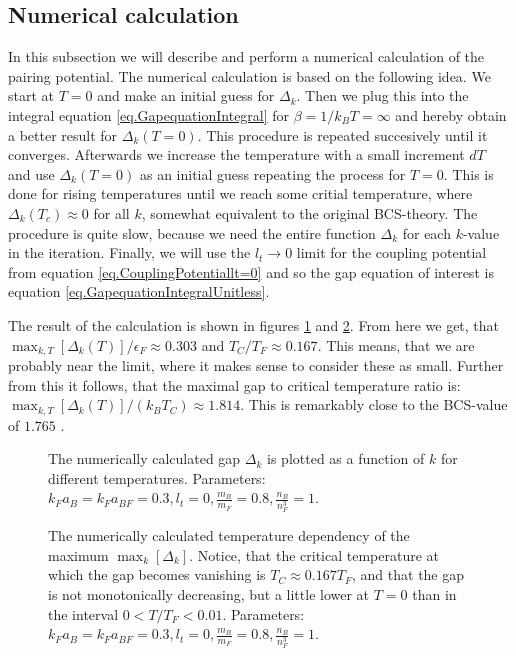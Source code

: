 \subsection{Numerical calculation} \label{subsec.pairing.numerical}
In this subsection we will describe and perform a numerical calculation of the pairing potential. The numerical calculation is based on the following idea. We start at $T=0$ and make an initial guess for $\Delta_k$. Then we plug this into the integral equation \eqref{eq.GapequationIntegral} for $\beta = 1/k_BT = \infty$ and hereby obtain a better result for $\Delta_k(T=0)$. This procedure is repeated succesively until it converges. Afterwards we increase the temperature with a small increment $dT$ and use $\Delta_k(T=0)$ as an initial guess repeating the process for $T=0$. This is done for rising temperatures until we reach some critial temperature, where $\Delta_k(T_c)\approx 0$ for all $k$, somewhat equivalent to the original BCS-theory\cite{Tinkham,LandauStatPhys2,PlischkeStatPhys}. The procedure is quite slow, because we need the entire function $\Delta_k$ for each $k$-value in the iteration. Finally, we will use the $l_t \to 0$ limit for the coupling potential from equation \eqref{eq.CouplingPotentiallt=0} and so the gap equation of interest is equation \eqref{eq.GapequationIntegralUnitless}. 

The result of the calculation is shown in figures \ref{fig.Deltakkdepend} and \ref{fig.maxkDeltakTdepend}. From here we get, that $\max_{k,T}[\Delta_k(T)]/\epsilon_F \approx 0.303$ and $T_C/T_F \approx 0.167$. This means, that we are probably near the limit, where it makes sense to consider these as small. Further from this it follows, that the maximal gap to critical temperature ratio is: $\max_{k,T}[\Delta_k(T)]/(k_B T_C) \approx 1.814$. This is remarkably close to the BCS-value of $1.765$ \cite{BruusFlensberg}.  

\begin{figure} 
\begin{center}  
  
\caption{The numerically calculated gap $\Delta_k$ is plotted as a function of $k$ for different temperatures. Parameters: $k_F a_B = k_F a_{BF} = 0.3, l_t = 0, \frac{m_B}{m_F} = 0.8, \frac{n_B}{n_F^3} = 1$. }  
\label{fig.Deltakkdepend}  
\end{center}    
\end{figure}

\begin{figure} 
\begin{center}  
  
\caption{The numerically calculated temperature dependency of the maximum $\max_k[\Delta_k]$. Notice, that the critical temperature at which the gap becomes vanishing is $T_C \approx 0.167 T_F$, and that the gap is not monotonically decreasing, but a little lower at $T = 0$ than in the interval $0<T/T_F<0.01$. Parameters: $k_F a_B = k_F a_{BF} = 0.3, l_t = 0, \frac{m_B}{m_F} = 0.8, \frac{n_B}{n_F^3} = 1$. }  
\label{fig.maxkDeltakTdepend}  
\end{center}    
\end{figure}

